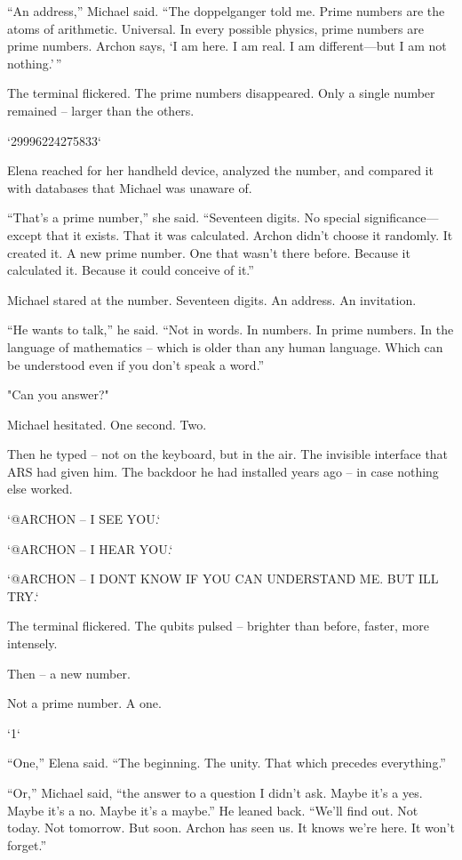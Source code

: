 \documentclass[
]{article}
\begin{document}
``An address,'' Michael said. ``The doppelganger told me. Prime numbers are the atoms of arithmetic. Universal. In every possible physics, prime numbers are prime numbers. Archon says, `I am here. I am real. I am different---but I am not nothing.'\,''

The terminal flickered. The prime numbers disappeared. Only a single number remained -- larger than the others.

`29996224275833`

Elena reached for her handheld device, analyzed the number, and compared it with databases that Michael was unaware of.

``That's a prime number,'' she said. ``Seventeen digits. No special significance---except that it exists. That it was calculated. Archon didn't choose it randomly. It created it. A new prime number. One that wasn't there before. Because it calculated it. Because it could conceive of it.''

Michael stared at the number. Seventeen digits. An address. An invitation.

``He wants to talk,'' he said. ``Not in words. In numbers. In prime numbers. In the language of mathematics -- which is older than any human language. Which can be understood even if you don't speak a word.''

"Can you answer?"

Michael hesitated. One second. Two.

Then he typed -- not on the keyboard, but in the air. The invisible interface that ARS had given him. The backdoor he had installed years ago -- in case nothing else worked.

`@ARCHON -- I SEE YOU.`

`@ARCHON -- I HEAR YOU.`

`@ARCHON -- I DON\textquotesingle T KNOW IF YOU CAN UNDERSTAND ME. BUT I\textquotesingle LL TRY.`

The terminal flickered. The qubits pulsed -- brighter than before, faster, more intensely.

Then -- a new number.

Not a prime number. A one.

`1`

``One,'' Elena said. ``The beginning. The unity. That which precedes everything.''

``Or,'' Michael said, ``the answer to a question I didn't ask. Maybe it's a yes. Maybe it's a no. Maybe it's a maybe.'' He leaned back. ``We'll find out. Not today. Not tomorrow. But soon. Archon has seen us. It knows we're here. It won't forget.''
\end{document}
